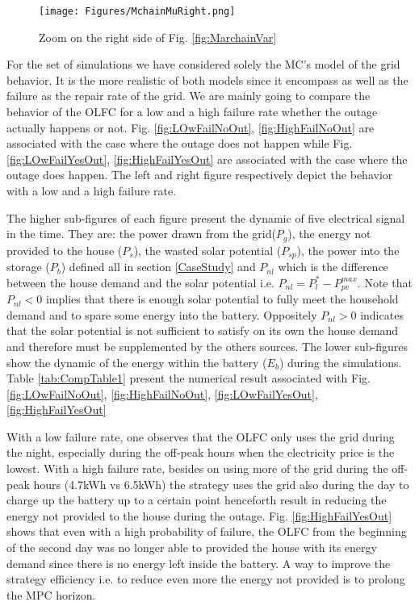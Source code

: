 \documentclass[conference]{IEEEtran}
\begin{document}
 \begin{figure}[!htb]
        \begin{center}
                \texttt{[image: Figures/MchainMuRight.png]}
        \end{center}
        \caption{Zoom on the right side of Fig. \ref{fig:MarchainVar}
        }
        \label{fig:MarchainVarRight}
\end{figure}

  For the set of simulations we have considered solely the MC's model of the grid behavior. It is the more realistic of both models since it encompass as well as the failure as the repair rate of the grid. We are mainly going to compare the behavior of the OLFC for a low and a high failure rate whether the outage actually happens or not. Fig. \ref{fig:LOwFailNoOut}, \ref{fig:HighFailNoOut} are associated with the case where the outage does not happen while Fig. \ref{fig:LOwFailYesOut}, \ref{fig:HighFailYesOut} are associated with the case where the outage does happen. The left and right figure respectively depict the behavior with a low and a high failure rate. 
  
  The higher sub-figures of each figure present the dynamic of  five electrical signal in the time. They are: the power drawn from the grid($P_g$), the energy not provided to the house ($P_s$), the wasted solar potential ($P_{sp}$), the power into the storage ($P_b$) defined all in section \ref{CaseStudy} and $P_{nl}$ which is the difference between the house demand and the solar potential i.e. $P_{nl} = P_l^* - P_{pv}^{max}$. Note that $P_{nl} < 0$ implies that there is enough solar potential to fully meet the household demand and to spare some energy into the battery. Oppositely $P_{nl} > 0$  indicates that the solar potential is not sufficient to satisfy on its own the house demand and therefore must be supplemented by the others sources. The lower sub-figures show the dynamic of the energy within the battery ($E_b$) during the simulations. Table \ref{tab:CompTable1} present the numerical result associated with Fig. \ref{fig:LOwFailNoOut}, \ref{fig:HighFailNoOut}, \ref{fig:LOwFailYesOut}, \ref{fig:HighFailYesOut}
  
  With a low failure rate, one observes that the OLFC only uses the grid during the night, especially during the off-peak hours when the electricity price is the lowest. With a high failure rate, besides on using  more of the grid during the off-peak hours (4.7kWh vs 6.5kWh) the strategy uses the grid also during the day to charge up the battery up to a certain point henceforth result in reducing the energy not provided to the house during the outage. Fig. \ref{fig:HighFailYesOut} shows that even with a high probability of failure, the OLFC from the beginning of the second day was no longer able to provided the house with its energy demand since there is no energy left inside the battery. A way to improve the strategy efficiency i.e. to reduce even more the energy not provided is to prolong the MPC horizon.
  
\end{document}

